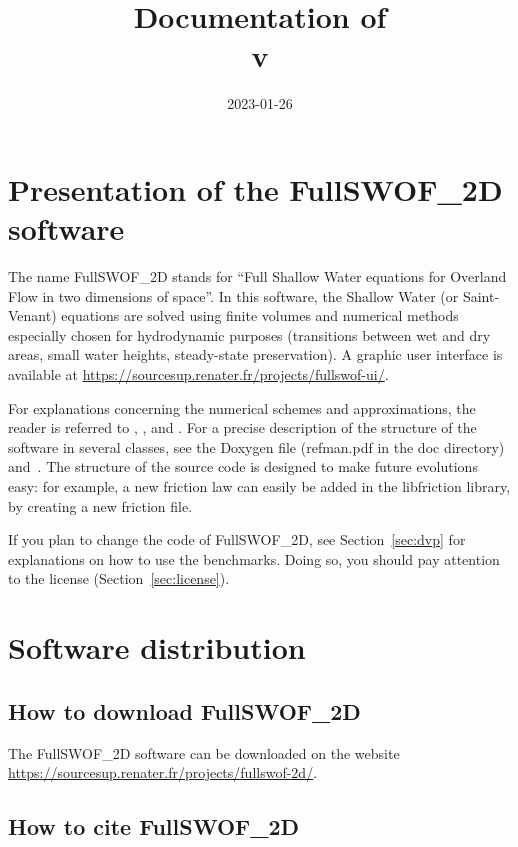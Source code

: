 \documentclass[a4paper, 11pt]{article}
\title{Documentation of \FullSWOF\\v\version}
\author{\contactFullName}%
\date{2023-01-26} %
\newcommand{\FullSWOF}{FullSWOF\_2D}
\newcommand{\MainWebSite}{\url{https://sourcesup.renater.fr/projects/fullswof-2d/}}
\begin{document}
\maketitle

\thispagestyle{fancy}

\tableofcontents

\section{Presentation of the \FullSWOF{} software}

The name \FullSWOF{} stands for ``Full Shallow Water equations for Overland Flow in two dimensions of space''.
In this software, the Shallow Water (or Saint-Venant) equations are solved using finite volumes and numerical methods especially chosen for hydrodynamic purposes (transitions between wet and dry areas, small water heights, steady-state preservation\textellipsis).
A graphic user interface is available at \url{https://sourcesup.renater.fr/projects/fullswof-ui/}.

For explanations concerning the numerical schemes and approximations, the reader is referred to \citet{Delestre14}, \citet{Delestre10b}, \citet{Delestre09} and \citet{DelestreJames09}.
For a precise description of the structure of the software in several classes, see the Doxygen file (\textsf{refman.pdf} in the \textsf{doc} directory) and~\citet{Delestre08}.
The structure  of the source code is designed to make future evolutions easy: for example, a new friction law can easily be added in the \textsf{libfriction} library, by creating a new friction file.

If you plan to change the code of \FullSWOF, see Section~\ref{sec:dvp} for explanations on how to use the benchmarks.
Doing so, you should pay attention to the license (Section~\ref{sec:license}).

\section{Software distribution}

\subsection{How to download \FullSWOF}
The \FullSWOF{} software can be downloaded on the website \MainWebSite.

\subsection{How to cite \FullSWOF}
\end{document}
